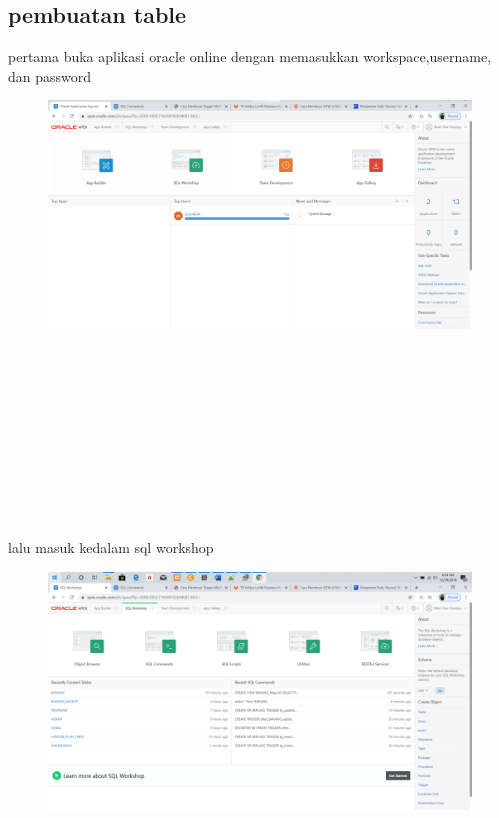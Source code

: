\documentclass{article}
\begin{document}
\subsection{pembuatan table}
\par pertama buka aplikasi oracle online dengan memasukkan workspace,username, dan password
\begin{figure}[h]
\includegraphics[scale=0.3]{img/1.PNG}
\end{figure}
\\
\\
\\
\\
\\
\\
\\
\\
\\
\par lalu masuk kedalam sql workshop
\begin{figure}[h]
\includegraphics[scale=0.3]{img/2.PNG}
\end{figure}
\\
\\
\\
\end{document}
